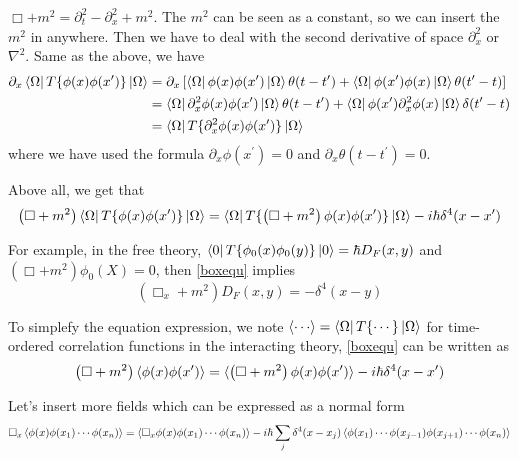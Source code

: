 \documentclass[12pt,openany]{book}
\begin{document}
	 $\Box+m^2=\partial_t^2-\partial_x^2+m^2$. The $m^2$ can be  seen as a constant, so 
	 we can insert the $m^2$ in anywhere. Then we have to deal with the second derivative
	 of space $\partial_x^2$ or $\nabla^2$. Same as the above, we have 
	 \begin{equation}
	 	\begin{aligned}
	 		\partial_x\bra{\Omega}T\{\phi(x)\phi(x^\prime)\}\ket{\Omega}&=\partial_x\left[\bra{\Omega}\phi(x)\phi(x^\prime)\ket{\Omega}\theta(t-t^\prime)+ \bra{\Omega}\phi(x^\prime)\phi(x)\ket{\Omega}\theta(t^\prime-t)\right]\\
	 		                                                            &=\bra{\Omega}\partial_x^2\phi(x)\phi(x^\prime)\ket{\Omega}\theta(t-t^\prime)+\bra{\Omega}\phi(x^\prime)\partial_x^2\phi(x)\ket{\Omega}\delta(t^\prime-t)\\
	 		                                                            &=\bra{\Omega}T\{\partial_x^2\phi(x)\phi(x^\prime)\}\ket{\Omega}
	 	\end{aligned}
	 \end{equation}
	 where we have used the formula $\partial_x\phi(x^\prime)=0$ and $\partial_x\theta(t-t^\prime)=0$.
	 \par 
	 Above all, we get that
	 \begin{equation}\label{boxequ}
	 		\left(\Box+m^2\right)\bra{\Omega}T\{\phi(x)\phi(x^\prime)\}\ket{\Omega}=\bra{\Omega}T\{\left(\Box+m^2\right)\phi(x)\phi(x^\prime)\}\ket{\Omega}-i\hbar\delta^4(x-x^\prime)
	 \end{equation}\par 
	For example, in the free theory, $\bra{0}T\{\phi_0(x)\phi_0(y)\}\ket{0}=\hbar D_F(x,y)$ and $\left(\Box+m^2\right)\phi_0(X)=0$, then \eqref{boxequ} implies 
	\begin{equation}
		\left(\Box_x+m^2\right)D_F(x,y)=-\delta^4(x-y)
	\end{equation}
	\par 
	To simplefy the equation expression, we note $\braket{\cdots}=\bra{\Omega}T\{\cdots\}\ket{\Omega}$ for time-ordered correlation functions in the interacting theory, \eqref{boxequ}
    can be written as 
    \begin{equation}
    	\left(\Box+m^2\right)\braket{\phi(x)\phi(x^\prime)}=\braket{\left(\Box+m^2\right)\phi(x)\phi(x^\prime)}-i\hbar\delta^4(x-x^\prime)
    \end{equation}\par 
    Let's insert more fields which can be expressed as a normal form
    \begin{equation*}
    	\Box_x\braket{\phi(x)\phi(x_1)\cdots\phi(x_n)}=\braket{\Box_x\phi(x)\phi(x_1)\cdots\phi(x_n)}-i\hbar\sum_{j}\delta^4(x-x_j)\braket{\phi(x_1)\cdots\phi(x_{j-1})\phi(x_{j+1})\cdots\phi(x_n)}
    \end{equation*}\par 
\end{document}
